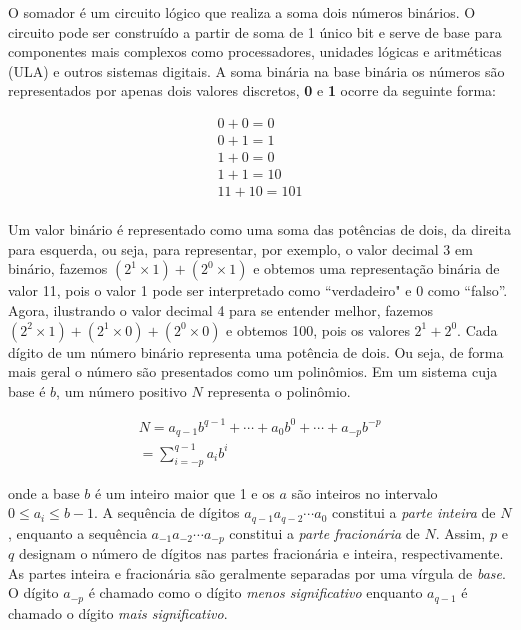 \documentclass{article}
\begin{document}
O somador é um circuito lógico que realiza a soma dois números binários. O circuito pode ser construído a partir de soma de 1 único bit e serve de base para componentes mais complexos como processadores, unidades lógicas e aritméticas (ULA) e outros sistemas digitais. A soma binária na base binária os números são representados por apenas dois valores discretos, \textbf{0} e \textbf{1} ocorre da seguinte forma:

\begin{eqnarray}
0 + 0 = 0 \\ \nonumber
0 + 1 = 1 \\ \nonumber
1 + 0 = 0 \\ \nonumber
1 + 1 = 10 \\ \nonumber
11 + 10 = 101 \\ \nonumber
\end{eqnarray}

Um valor binário é representado como uma soma das potências de dois, da direita para esquerda, ou seja, para representar, por exemplo, o valor decimal 3 em binário, fazemos $(2^1 \times 1) + (2^0 \times 1)$ e obtemos uma representação binária de valor 11, pois o valor 1 pode ser interpretado como ``verdadeiro" e 0 como ``falso''. Agora, ilustrando o valor decimal 4 para se entender melhor, fazemos $(2^2 \times 1) + (2^1 \times 0) + (2^0 \times 0)$ e obtemos 100, pois os valores $2^1 + 2^0$. Cada dígito de um número binário representa uma potência de dois. Ou seja, de forma mais geral o número são presentados como um polinômios. Em um sistema cuja base é $b$, um número positivo $N$ representa o polinômio.

\begin{eqnarray}
N = a_{q-1}b^{q-1} + \cdots + a_{0}b^{0} + \cdots + a_{-p}b^{-p} \\ 
= \sum^{q-1}_{i=-p} a_i b^i 
\end{eqnarray}

\noindent onde a base $b$ é um inteiro maior que 1 e os $a$ são inteiros no intervalo $0 \leq a_i \leq b - 1$. A sequência de dígitos $a_{q-1} a_{q-2} \cdots a_0$ constitui a \emph{parte inteira} de $N$, enquanto a sequência $a_{-1} a_{-2} \cdots a_{-p}$ constitui a \emph{parte fracionária} de $N$. Assim, $p$ e $q$ designam o número de dígitos nas partes fracionária e inteira, respectivamente. As partes inteira e fracionária são geralmente separadas por uma vírgula de \emph{base}. O dígito $a_{-p}$ é chamado como o dígito \emph{menos significativo} enquanto $a_{q-1}$ é chamado o dígito \emph{mais significativo}.
\end{document}
